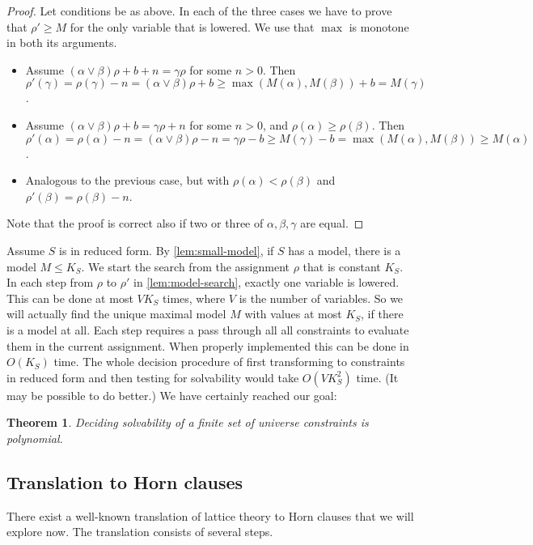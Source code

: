 \documentclass[11pt,a4paper]{article}
\newtheorem{theorem}{Theorem}[section]
\begin{document}
\begin{proof}
Let conditions be as above. In each of the three cases we
have to prove that $\rho'\geq M$ for the only variable that is lowered.
We use that $\max$ is monotone in both its arguments.
\begin{itemize}
\item Assume
$(\alpha\vee\beta)\rho +b+n = \gamma\rho$ for some $n>0$.
Then $\rho'(\gamma) = \rho(\gamma)-n = (\alpha\vee\beta)\rho + b \geq
\max(M(\alpha),M(\beta)) +b = M(\gamma)$.
\item Assume
$(\alpha\vee\beta)\rho +b = \gamma\rho + n$ for some $n>0$, and
$\rho(\alpha)\geq\rho(\beta)$.
Then $\rho'(\alpha) = \rho(\alpha)-n = (\alpha\vee\beta)\rho -n =
\gamma\rho - b \geq M(\gamma)-b = \max(M(\alpha),M(\beta)) \geq M(\alpha)$.
\item Analogous to the previous case, but with $\rho(\alpha)<\rho(\beta)$
and $\rho'(\beta)=\rho(\beta)-n$.
\end{itemize}
Note that the proof is correct also if two or three of $\alpha,\beta,\gamma$
are equal.
\end{proof}

Assume $S$ is in reduced form. By \cref{lem:small-model},
if $S$ has a model, there is a model $M \leq K_S$.
We start the search from the assignment $\rho$ that is constant $K_S$.
In each step from $\rho$ to $\rho'$ in \cref{lem:model-search},
exactly one variable is lowered. This can be done at most $V K_S$ times,
where $V$ is the number of variables. So we will actually find the unique maximal
model $M$ with values at most $K_S$, if there is a model at all.
Each step requires a pass through all
all constraints to evaluate them in the current assignment.
When properly implemented this can be done in $O(K_S)$ time.
The whole decision procedure of first transforming to constraints in reduced
form and then testing for solvability would take $O(V K^2_S)$ time.
(It may be possible to do better.) We have certainly reached our goal:

\begin{theorem}\label{thm:P-solvability}
Deciding solvability of a finite set of universe constraints is polynomial.
\end{theorem}

\subsection{Translation to Horn clauses}

There exist a well-known translation of lattice theory to Horn clauses
that we will explore now. The translation consists of several steps.
\end{document}
